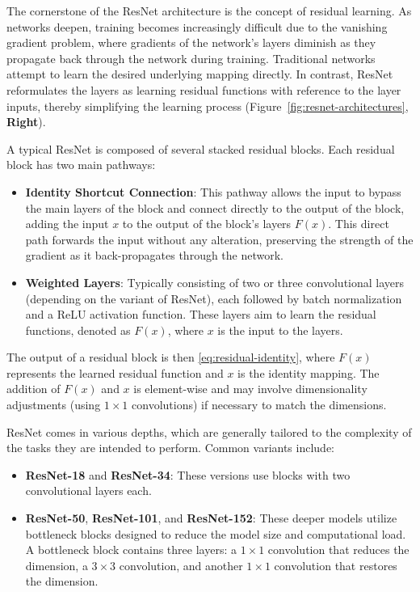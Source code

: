 The cornerstone of the ResNet architecture is the concept of residual learning. As networks deepen,
training becomes increasingly difficult due to the vanishing gradient problem, where gradients of
the network's layers diminish as they propagate back through the network during training.
Traditional networks attempt to learn the desired underlying mapping directly. In contrast, ResNet
reformulates the layers as learning residual functions with reference to the layer inputs, thereby
simplifying the learning process (Figure~\ref{fig:resnet-architectures}, \textbf{Right}).

A typical ResNet is composed of several stacked residual blocks. Each residual block has two main
pathways:

\begin{itemize}
    \item \textbf{Identity Shortcut Connection}: This pathway allows the input to bypass the main layers of the block and connect directly to the output of the block, adding the input $x$ to the output of the block's layers $F(x)$. This direct path forwards the input without any alteration, preserving the strength of the gradient as it back-propagates through the network.
    \item \textbf{Weighted Layers}: Typically consisting of two or three convolutional layers (depending on the variant of ResNet), each followed by batch normalization and a ReLU activation function. These layers aim to learn the residual functions, denoted as $F(x)$, where $x$ is the input to the layers.
\end{itemize}

The output of a residual block is then \eqref{eq:residual-identity}, where $F(x)$ represents the
learned residual function and $x$ is the identity mapping. The addition of $F(x)$ and $x$ is
element-wise and may involve dimensionality adjustments (using $1\times 1$ convolutions) if
necessary to match the dimensions.

ResNet comes in various depths, which are generally tailored to the complexity of the tasks they are
intended to perform. Common variants include:

\begin{itemize}
    \item \textbf{ResNet-18} and \textbf{ResNet-34}: These versions use blocks with two convolutional layers each.
    \item \textbf{ResNet-50}, \textbf{ResNet-101}, and \textbf{ResNet-152}: These deeper models utilize bottleneck blocks designed to reduce the model size and computational load. A bottleneck block contains three layers: a $1\times 1$ convolution that reduces the dimension, a $3\times 3$ convolution, and another $1\times 1$ convolution that restores the dimension.
\end{itemize}

